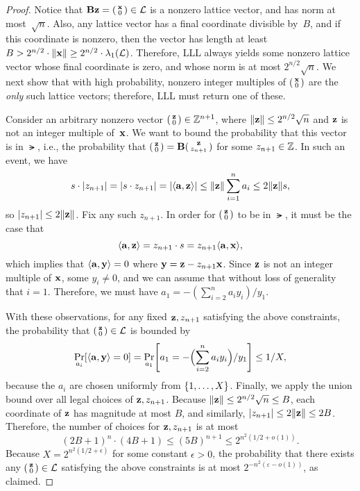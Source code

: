 \documentclass[11pt]{article}
\begin{document}
\begin{proof}
  Notice that $\matB \vecz = \smlmat{\vecx \\ 0} \in \lat$ is a
  nonzero lattice vector, and has norm at most~$\sqrt{n}$. Also, any
  lattice vector has a final coordinate divisible by~$B$, and if this
  coordinate is nonzero, then the vector has length at least
  $B > 2^{n/2} \cdot \length{\vecx} \geq 2^{n/2} \cdot
  \lambda_{1}(\lat)$. Therefore, LLL always yields some nonzero
  lattice vector whose final coordinate is zero, and whose norm is at
  most $2^{n/2} \sqrt{n}$. We next show that with high probability,
  nonzero integer multiples of $\smlmat{\vecx \\ 0}$ are the
  \emph{only} such lattice vectors; therefore, LLL must return one of
  these.

  Consider an arbitrary nonzero vector
  $\smlmat{\vecz \\ 0} \in \Z^{n+1}$, where
  $\length{\vecz} \leq 2^{n/2} \sqrt{n}$ and $\vecz$ is not an integer
  multiple of~$\vecx$. We want to bound the probability that this
  vector is in $\lat$, i.e., the probability that
  $\smlmat{\vecz \\ 0} = \matB \smlmat{\vecz \\ z_{n+1}}$ for some
  $z_{n+1} \in \Z$. In such an event, we have
  \[ s \cdot \abs{z_{n+1}} = \abs{s \cdot z_{n+1}} =
    \abs*{\inner{\veca,\vecz}} \leq \length{\vecz} \sum_{i=1}^n a_i
    \leq 2 \length{\vecz} s, \] so $|z_{n+1}| \leq 2\length{\vecz}$.
  Fix any such $z_{n+1}$. In order for $\smlmat{\vecz \\ 0}$ to be in
  $\lat$, it must be the case that
  \[
    \inner{\veca, \vecz} = z_{n+1} \cdot s = z_{n+1}
    \inner{\veca,\vecx}, \] which implies that
  $\inner{\veca, \vecy} = 0$ where $\vecy = \vecz - z_{n+1} \vecx$.
  Since $\vecz$ is not an integer multiple of $\vecx$, some
  $y_{i} \neq 0$, and we can assume that without loss of generality
  that $i=1$. Therefore, we must have
  $a_{1} = -(\sum_{i=2}^{n} a_{i} y_{i})/y_{1}$.

  With these observations, for any fixed $\vecz, z_{n+1}$ satisfying
  the above constraints, the probability that
  $\smlmat{\vecz \\ 0} \in \lat$ is bounded by
  \[ \Pr_{a_i} \bracks*{\inner{\veca, \vecy} = 0} =
    \Pr_{a_1}\bracks*{a_1 = -\parens[\Big]{\sum_{i=2}^n a_i
        y_{i}}/y_{1}} \leq 1/X, \] because the $a_i$ are chosen
  uniformly from $\set{1,\ldots,X}$. Finally, we apply the union bound
  over all legal choices of $\vecz, z_{n+1}$. Because
  $\length{\vecz} \leq 2^{n/2} \sqrt{n} \leq B$, each coordinate of
  $\vecz$ has magnitude at most $B$, and similarly,
  $\abs{z_{n+1}} \leq 2 \length{\vecz} \leq 2B$. Therefore, the number
  of choices for $\vecz, z_{n+1}$ is at most
  \[ (2B+1)^{n} \cdot (4B+1) \leq (5B)^{n+1} \leq
    2^{n^{2}(1/2+o(1))}. \] Because $X = 2^{n^{2}(1/2+\epsilon)}$ for
  some constant $\epsilon > 0$, the probability that there exists any
  $\smlmat{\vecz \\ 0} \in \lat$ satisfying the above constraints is
  at most $2^{-n^{2}(\varepsilon - o(1))}$, as claimed.
\end{proof}
\end{document}
